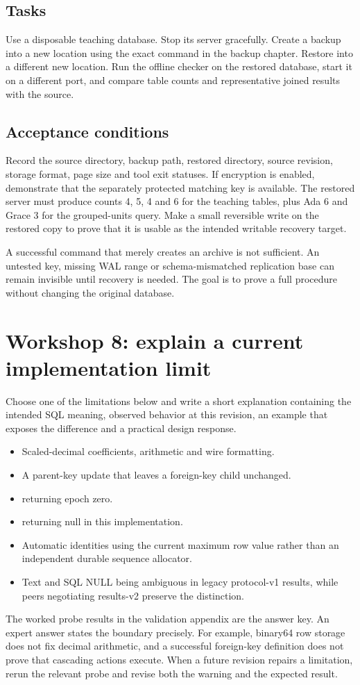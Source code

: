 \subsection{Tasks}
Use a disposable teaching database. Stop its server gracefully. Create a
backup into a new location using the exact command in the backup chapter.
Restore into a different new location. Run the offline checker on the
restored database, start it on a different port, and compare table counts
and representative joined results with the source.

\subsection{Acceptance conditions}
Record the source directory, backup path, restored directory, source
revision, storage format, page size and tool exit statuses. If encryption
is enabled, demonstrate that the separately protected matching key is
available. The restored server must produce counts 4, 5, 4 and 6 for the
teaching tables, plus Ada 6 and Grace 3 for the grouped-units query. Make a
small reversible write on the restored copy to prove that it is usable as
the intended writable recovery target.

A successful command that merely creates an archive is not sufficient.
An untested key, missing WAL range or schema-mismatched replication base can
remain invisible until recovery is needed. The goal is to prove a full
procedure without changing the original database.

\section{Workshop 8: explain a current implementation limit}
Choose one of the limitations below and write a short explanation containing
the intended SQL meaning, observed behavior at this revision, an example
that exposes the difference and a practical design response.
\begin{itemize}
\item Scaled-decimal coefficients, arithmetic and wire formatting.
\item A parent-key update that leaves a foreign-key child unchanged.
\item {} returning epoch zero.
\item {} returning null in this implementation.
\item Automatic identities using the current maximum row value rather than
an independent durable sequence allocator.
\item Text  and SQL NULL being ambiguous in legacy protocol-v1
results, while peers negotiating results-v2 preserve the distinction.
\end{itemize}
The worked probe results in the validation appendix are the answer key.
An expert answer states the boundary precisely. For example, binary64 row
storage does not fix decimal arithmetic, and a successful foreign-key
definition does not prove that cascading actions execute. When a future
revision repairs a limitation, rerun the relevant probe and revise both
the warning and the expected result.


